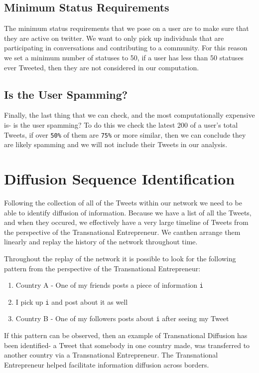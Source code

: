 \subsection{Minimum Status Requirements}
The minimum status requirements that we pose on a user are to make
sure that they are active on twitter. We want to only pick up
individuals that are participating in conversations and contributing
to a community. For this reason we set a minimum number of statuses to
50, if a user has less than 50 statuses ever Tweeted, then they are
not considered in our computation.

\subsection{Is the User Spamming?}
Finally, the last thing that we can check, and the most
computationally expensive is- is the user spamming? To do this we
check the latest 200 of a user's total Tweets, if over \verb|50%| of
them are \verb|75%| or more similar, then we can conclude they are
likely spamming and we will not include their Tweets in our analysis.

\section{Diffusion Sequence Identification}
Following the collection of all of the Tweets within our network we
need to be able to identify diffusion of information. Because we have
a list of all the Tweets, and when they occured, we effectively have a
very large timeline of Tweets from the perspective of the
Transnational Entrepreneur. We canthen arrange them linearly and
replay the history of the network throughout time.

Throughout the replay of the network it is possible to look for the
following pattern from the perspective of the Transnational
Entrepreneur:

\begin{enumerate}
\item Country A - One of my friends posts a piece of information \verb|i| 
\item I pick up \verb|i| and post about it as well
\item Country B - One of my followers posts about \verb|i| after seeing my Tweet
\end{enumerate}

If this pattern can be observed, then an example of Transnational
Diffusion has been identified- a Tweet that somebody in one country
made, was transferred to another country via a Transnational
Entrepreneur. The Transnational Entrepreneur helped facilitate
information diffusion across borders.

